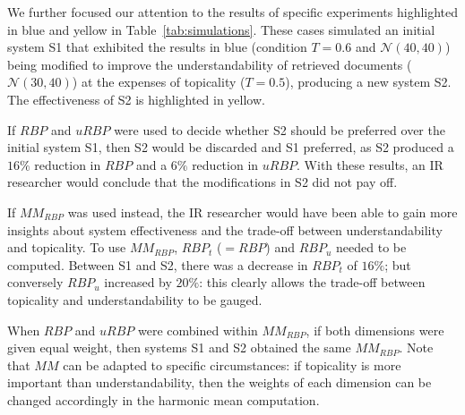 We further focused our attention to the results of specific experiments highlighted in blue and yellow in Table~\ref{tab:simulations}. These cases simulated an initial system S1 that exhibited the results in blue (condition $T=0.6$ and $\mathcal{N}(40,40)$) being modified to improve the understandability of retrieved documents ($\mathcal{N}(30,40)$) at the expenses of topicality ($T=0.5$), producing a new system S2. The effectiveness of S2 is highlighted in yellow. 

If $RBP$ and $uRBP$ were used to decide whether S2 should be preferred over the initial system S1, then S2 would be discarded and S1 preferred, as S2 produced a $16\%$ reduction in $RBP$ and a $6\%$ reduction in $uRBP$. With these results, an IR researcher would conclude that the modifications in S2 did not pay off.

If $MM_{RBP}$ was used instead, the IR researcher would have been able to gain more insights about system effectiveness and the trade-off between understandability and topicality. To use $MM_{RBP}$, $RBP_t$ ($=RBP$) and $RBP_u$ needed to be computed. Between S1 and S2, there was a decrease in $RBP_t$ of $16\%$; but conversely $RBP_u$ increased by $20\%$: this clearly allows the trade-off between topicality and understandability to be gauged. 

When $RBP$ and $uRBP$ were combined within $MM_{RBP}$, if both dimensions were given equal weight, then systems S1 and S2 obtained the same $MM_{RBP}$. Note that $MM$ can be adapted to specific circumstances: if topicality is more important than understandability, then the weights of each dimension can be changed accordingly in the harmonic mean computation. 


